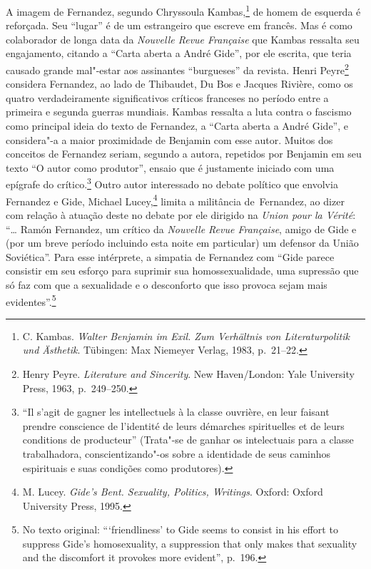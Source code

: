 A imagem de Fernandez, segundo Chryssoula Kambas,\footnote{C. Kambas.
  \emph{Walter Benjamin im Exil. Zum Verhältnis von Literaturpolitik und
  Ästhetik}. Tübingen: Max Niemeyer Verlag, 1983, p.~21--22.} de homem de
esquerda é reforçada. Seu ``lugar'' é de um estrangeiro que escreve em
francês. Mas é como colaborador de longa data da \emph{Nouvelle Revue
Française} que Kambas ressalta seu engajamento, citando a ``Carta aberta
a André Gide'', por ele escrita, que teria causado grande mal"-estar aos
assinantes ``burgueses'' da revista. Henri Peyre\footnote{Henry Peyre.
  \emph{Literature and Sincerity}. New Haven/London: Yale University
  Press, 1963, p.~249--250.} considera Fernandez, ao lado de Thibaudet, Du
Bos e Jacques Rivière, como os quatro verdadeiramente significativos
críticos franceses no período entre a primeira e segunda guerras
mundiais. Kambas ressalta a luta contra o fascismo como principal ideia do
texto de Fernandez, a ``Carta aberta a André Gide'', e considera"-a a
maior proximidade de Benjamin com esse autor. Muitos dos conceitos de
Fernandez seriam, segundo a autora, repetidos por Benjamin em seu texto
``O autor como produtor'', ensaio que é justamente iniciado com uma
epígrafe do crítico.\footnote{``Il s'agit de gagner les intellectuels à
  la classe ouvrière, en leur faisant prendre conscience de l'identité
  de leurs démarches spirituelles et de leurs conditions de producteur''
  (Trata"-se de ganhar os intelectuais para a classe trabalhadora,
  conscientizando"-os sobre a identidade de seus caminhos espirituais e
  suas condições como produtores).} Outro autor interessado no debate
político que envolvia Fernandez e Gide, Michael Lucey,\footnote{M.
  Lucey. \emph{Gide's Bent. Sexuality, Politics, Writings}. Oxford:
  Oxford University Press, 1995.} limita a militância de~Fernandez, ao
dizer com relação à atuação deste no debate por ele dirigido na \emph{Union
pour la Vérité}: ``\ldots{} Ramón Fernandez, um crítico da \emph{Nouvelle
Revue Française}, amigo de Gide e (por um breve período incluindo esta
noite em particular) um defensor da União Soviética''. Para esse
intérprete, a simpatia de Fernandez com ``Gide parece consistir em seu
esforço para suprimir sua homossexualidade, uma supressão que só faz com
que a sexualidade e o desconforto que isso provoca sejam mais
evidentes''.\footnote{No texto original: ```friendliness' to Gide seems
  to consist in his effort to suppress Gide's homosexuality, a
  suppression that only makes that sexuality and the discomfort it
  provokes more evident'', p.~196.}

